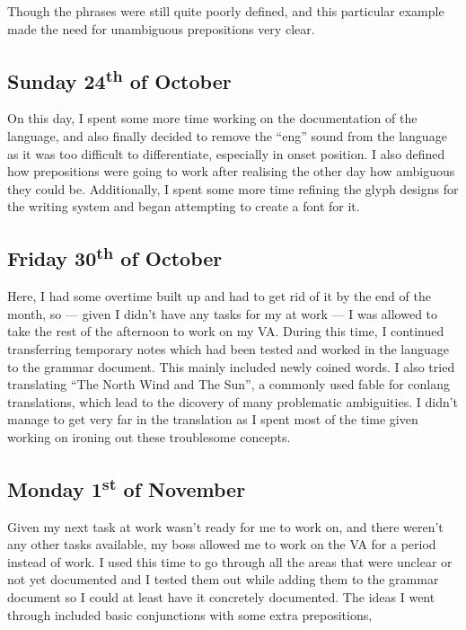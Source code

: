 \documentclass[a4paper,10pt]{article}
\begin{document}
Though the phrases were still quite poorly defined, and this particular example made the
need for unambiguous prepositions very clear.

\subsection{Sunday 24\textsuperscript{th} of October}
On this day, I spent some more time working on the documentation of the language, and
also finally decided to remove the ``eng'' sound from the language as it was too difficult
to differentiate, especially in onset position. I also defined how prepositions were going
to work after realising the other day how ambiguous they could be. Additionally, I spent
some more time refining the glyph designs for the writing system and began attempting to
create a font for it.

\subsection{Friday 30\textsuperscript{th} of October}
Here, I had some overtime built up and had to get rid of it by the end of the month, so ---
given I didn't have any tasks for my at work --- I was allowed to take the rest of the
afternoon to work on my VA. During this time, I continued transferring temporary notes which
had been tested and worked in the language to the grammar document. This mainly included
newly coined words. I also tried translating ``The North Wind and The Sun'', a commonly used
fable for conlang translations, which lead to the dicovery of many problematic ambiguities.
I didn't manage to get very far in the translation as I spent most of the time given working
on ironing out these troublesome concepts.

\subsection{Monday 1\textsuperscript{st} of November}
Given my next task at work wasn't ready for me to work on, and there weren't any other tasks
available, my boss allowed me to work on the VA for a period instead of work. I used this
time to go through all the areas that were unclear or not yet documented and I tested them
out while adding them to the grammar document so I could at least have it concretely
documented. The ideas I went through included basic conjunctions with some extra prepositions,
\end{document}
